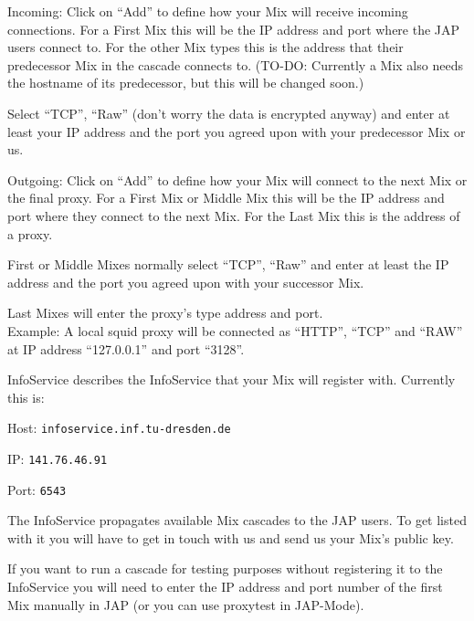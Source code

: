 \documentclass{article}
\begin{document}
\begin{description}
  
\item{Incoming}: Click on ``Add'' to define how your Mix will receive
  incoming connections. For a First Mix this will be the IP address
  and port where the JAP users connect to. For the other Mix types
  this is the address that their predecessor Mix in the cascade
  connects to. (TO-DO: Currently a Mix also needs the hostname of
  its predecessor, but this will be changed soon.)
  
  Select ``TCP'', ``Raw'' (don't worry the data is encrypted anyway)
  and enter at least your IP address and the port you agreed upon with
  your predecessor Mix or us.
  
\item{Outgoing}: Click on ``Add'' to define how your Mix will connect
  to the next Mix or the final proxy. For a First Mix or Middle Mix
  this will be the IP address and port where they connect to the next
  Mix. For the Last Mix this is the address of a proxy. 
  
  First or Middle Mixes normally select ``TCP'', ``Raw'' and enter at
  least the IP address and the port you agreed upon with your
  successor Mix. 
  
  Last Mixes will enter the proxy's type address and port. \\
  Example: A local squid proxy will be connected as ``HTTP'', ``TCP''
  and ``RAW'' at IP address ``127.0.0.1'' and port ``3128''.

\item{InfoService} describes the InfoService that your Mix will register with.
Currently this is:

\begin{description}
\item{Host}: \verb|infoservice.inf.tu-dresden.de| 
\item{IP}: \verb|141.76.46.91| 
\item{Port}: \verb|6543| 
\end{description}  

The InfoService propagates available Mix cascades to the JAP users. To
get listed with it you will have to get in touch with us and send us
your Mix's public key.

If you want to run a cascade for testing purposes without registering
it to the InfoService you will need to enter the IP address and port
number of the first Mix manually in JAP (or you can use proxytest in
JAP-Mode).

\end{description}
\end{document}
